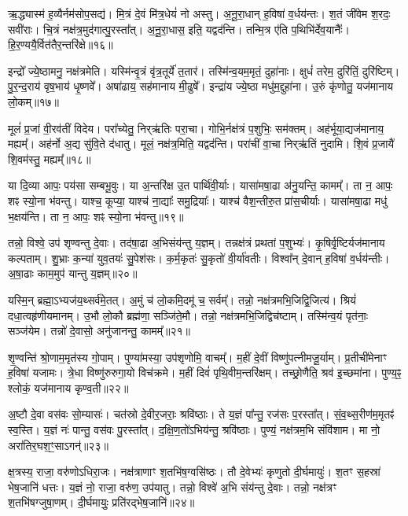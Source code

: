 ऋ॒द्ध्यास्म॑ ह॒व्यैर्नम॑सोप॒सद्य॑।
मि॒त्रं दे॒वं मि॑त्र॒धेयं॑ नो अस्तु।
अ॒नू॒रा॒धान् ह॒विषा॑ व॒र्धय॑न्तः।
श॒तं जी॑वेम श॒रदः॒ सवी॑राः।
चि॒त्रं नक्ष॑त्र॒मुद॑गात्पु॒रस्ता᳚त्।
अ॒नू॒रा॒धास॒ इति॒ यद्वद॑न्ति।
तन्मि॒त्र ए॑ति प॒थिभि॑र्देव॒यानैः᳚।
हि॒र॒ण्ययै॒र्वित॑तै\-र॒न्तरि॑क्षे॥१६॥ 

इन्द्रो᳚ ज्ये॒ष्ठामनु॒ नक्ष॑त्रमेति।
यस्मि॑न्वृ॒त्रं वृ॑त्र॒तूर्ये॑ त॒तार॑।
तस्मि॑न्व॒यम॒मृतं॒ दुहा॑नाः।
क्षुधं॑ तरेम॒ दुरि॑तिं॒ दुरि॑ष्टिम्।
पु॒र॒न्द॒राय॑ वृष॒भाय॑ धृ॒ष्णवे᳚।
अषा॑ढाय॒ सह॑मानाय मी॒ढुषे᳚।
इन्द्रा॑य ज्ये॒ष्ठा मधु॑म॒द्दुहा॑ना।
उ॒रुं कृ॑णोतु॒ यज॑मानाय लो॒कम्॥१७॥ 

मूलं॑ प्र॒जां वी॒रव॑तीं विदेय।
परा᳚च्येतु॒ निर्‌ऋ॑तिः परा॒चा।
गोभि॒र्नक्ष॑त्रं प॒शुभिः॒ सम॑क्तम्।
अह॑र्भूया॒द्यज॑मानाय॒ मह्यम्᳚।
अह॑र्नो अ॒द्य सु॑वि॒ते द॑धातु।
मूलं॒ नक्ष॑त्र॒मिति॒ यद्वद॑न्ति।
परा॑चीं वा॒चा निर्‌ऋ॑तिं नुदामि।
शि॒वं प्र॒जायै॑ शि॒वम॑स्तु॒ मह्यम्᳚॥१८॥ 

या दि॒व्या आपः॒ पय॑सा सम्बभू॒वुः।
या अ॒न्तरि॑क्ष उ॒त पार्थि॑वी॒र्याः।
यासा॑मषा॒ढा अ॑नु॒यन्ति॒ कामम्᳚।
ता न॒ आपः॒ शꣴ स्यो॒ना भ॑वन्तु।
याश्च॒ कूप्या॒ याश्च॑ ना॒द्याः᳚ समु॒द्रियाः᳚।
याश्च॑ वैश॒न्तीरु॒त प्रा॑स॒चीर्याः।
यासा॑मषा॒ढा मधु॑ भ॒क्षय॑न्ति।
ता न॒ आपः॒ शꣴ स्यो॒ना भ॑वन्तु॥१९॥ 

तन्नो॒ विश्वे॒ उप॑ शृण्वन्तु दे॒वाः।
तद॑षा॒ढा अ॒भिसंय॑न्तु य॒ज्ञम्।
तन्नक्ष॑त्रं प्रथतां प॒शुभ्यः॑।
कृ॒षिर्वृ॒ष्टिर्यज॑मानाय कल्पताम्।
शु॒भ्राः क॒न्या॑ युव॒तयः॑ सु॒पेश॑सः।
क॒र्म॒कृतः॑ सु॒कृतो॑ वी॒र्या॑वतीः।
विश्वा᳚न् दे॒वान् ह॒विषा॑ व॒र्धय॑न्तीः।
अ॒षा॒ढाः काम॒मुप॑ यान्तु य॒ज्ञम्॥२०॥ 

यस्मि॒न् ब्रह्मा॒\-ऽभ्यज॑य॒थ्सर्व॑मे॒तत्।
अ॒मुं च॑ लो॒कमि॒दमू॑ च॒ सर्वम्᳚।
तन्नो॒ नक्ष॑त्रमभि॒जिद्वि॒जित्य॑।
श्रियं॑ दधा॒त्वहृ॑णीय\-मानम्।
उ॒भौ लो॒कौ ब्रह्म॑णा॒ सञ्जि॑ते॒मौ।
तन्नो॒ नक्ष॑त्रमभि॒जिद्विच॑ष्टाम्।
तस्मि॑न्व॒यं पृत॑नाः॒ सञ्ज॑येम।
तन्नो॑ दे॒वासो॒ अनु॑जानन्तु॒ कामम्᳚॥२१॥ 

शृ॒ण्वन्ति॑ श्रो॒णाम॒मृत॑स्य गो॒पाम्।
पुण्या॑मस्या॒ उप॑शृणोमि॒ वाचम्᳚।
म॒हीं दे॒वीं विष्णु॑पत्नीमजू॒र्याम्।
प्र॒तीची॑मेनाꣳ ह॒विषा॑ यजामः।
त्रे॒धा विष्णु॑रुरुगा॒यो विच॑क्रमे।
म॒हीं दिवं॑ पृथि॒वीम॒न्तरि॑क्षम्।
तच्छ्रो॒णैति॒ श्रव॑ इ॒च्छमा॑ना।
पुण्य॒ꣴ॒ श्लोकं॒ यज॑मानाय कृण्व॒ती॥२२॥ 

अ॒ष्टौ दे॒वा वस॑वः सो॒म्यासः॑।
चत॑स्रो दे॒वीर॒जराः॒ श्रवि॑ष्ठाः।
ते य॒ज्ञं पा᳚न्तु॒ रज॑सः प॒रस्ता᳚त्।
सं॒व॒थ्स॒रीण॑म॒मृतꣴ॑ स्व॒स्ति।
य॒ज्ञं नः॑ पान्तु॒ वस॑वः पु॒रस्ता᳚त्।
द॒क्षि॒ण॒तो॑ऽभिय॑न्तु॒ श्रवि॑ष्ठाः।
पुण्यं॒ नक्ष॑त्रम॒भि संवि॑शाम।
मा नो॒ अरा॑तिर॒घश॒ꣳ॒साऽगन्॑{}॥२३॥ 

क्ष॒त्रस्य॒ राजा॒ वरु॑णोऽधिरा॒जः।
नक्ष॑त्राणाꣳ श॒तभि॑ष॒ग्वसि॑ष्ठः।
तौ दे॒वेभ्यः॑ कृणुतो दी॒र्घमायुः॑।
श॒तꣳ स॒हस्रा॑ भेष॒जानि॑ धत्तः।
य॒ज्ञं नो॒ राजा॒ वरु॑ण॒ उप॑यातु।
तन्नो॒ विश्वे॑ अ॒भि संय॑न्तु दे॒वाः।
तन्नो॒ नक्ष॑त्रꣳ श॒तभि॑षग्जुषा॒णम्।
दी॒र्घमायुः॒ प्रति॑रद्भेष॒जानि॑॥२४॥ 

